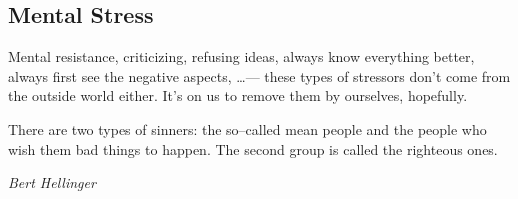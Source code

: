 \documentclass[../main.tex]{subfiles}
\begin{document}
  \subsection{Mental Stress}

  Mental resistance, criticizing, refusing ideas, always know everything better, always first see the negative aspects, \ldots ---
  these types of stressors don't come from the outside world either.
  It's on us to remove them by ourselves, hopefully.

  \epigraph{There are two types of sinners: the so--called mean people and the people who wish them bad things to happen. The second group is called the righteous ones.}{\textit{Bert Hellinger}}
\end{document}

